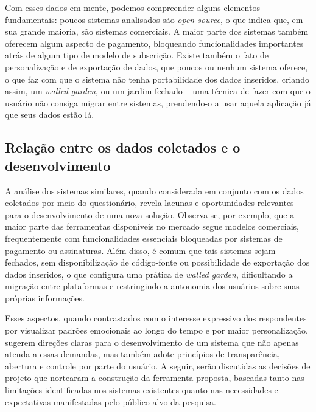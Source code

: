 Com esses dados em mente, podemos compreender alguns elementos fundamentais:
poucos sistemas analisados são \textit{open-source}, o que indica que, em sua
grande maioria, são sistemas comerciais. A maior parte dos sistemas também
oferecem algum aspecto de pagamento, bloqueando funcionalidades importantes
atrás de algum tipo de modelo de subscrição. Existe também o fato de
personalização e de exportação de dados, que poucos ou nenhum sistema oferece,
o que faz com que o sistema não tenha portabilidade dos dados inseridos,
criando assim, um \textit{walled garden}, ou um jardim fechado -- uma técnica de
fazer com que o usuário não consiga migrar entre sistemas, prendendo-o a usar
aquela aplicação já que seus dados estão lá.

\subsection{Relação entre os dados coletados e o desenvolvimento}

A análise dos sistemas similares, quando considerada em conjunto com os dados
coletados por meio do questionário, revela lacunas e oportunidades relevantes
para o desenvolvimento de uma nova solução. Observa-se, por exemplo, que a
maior parte das ferramentas disponíveis no mercado segue modelos comerciais,
frequentemente com funcionalidades essenciais bloqueadas por sistemas de
pagamento ou assinaturas. Além disso, é comum que tais sistemas sejam fechados,
sem disponibilização de código-fonte ou possibilidade de exportação dos dados
inseridos, o que configura uma prática de \textit{walled garden}, dificultando
a migração entre plataformas e restringindo a autonomia dos usuários sobre suas
próprias informações.

Esses aspectos, quando contrastados com o interesse expressivo dos respondentes
por visualizar padrões emocionais ao longo do tempo e por maior personalização,
sugerem direções claras para o desenvolvimento de um sistema que não apenas
atenda a essas demandas, mas também adote princípios de transparência, abertura
e controle por parte do usuário. A seguir, serão discutidas as decisões de
projeto que nortearam a construção da ferramenta proposta, baseadas tanto nas
limitações identificadas nos sistemas existentes quanto nas necessidades e
expectativas manifestadas pelo público-alvo da pesquisa.
